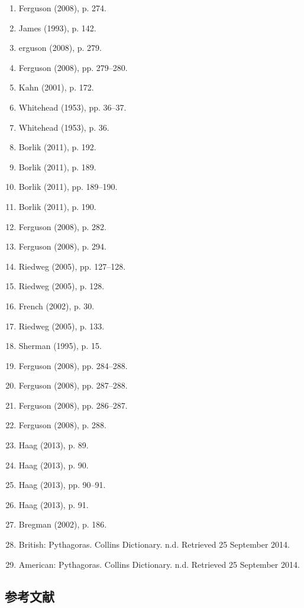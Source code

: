 \begin{enumerate}
\item Ferguson (2008), p. 274.  
\item James (1993), p. 142.  
\item erguson (2008), p. 279.  
\item Ferguson (2008), pp. 279–280.
\item Kahn (2001), p. 172.  
\item Whitehead (1953), pp. 36–37.  
\item Whitehead (1953), p. 36.  
\item Borlik (2011), p. 192.  
\item Borlik (2011), p. 189.  
\item Borlik (2011), pp. 189–190.  
\item Borlik (2011), p. 190.  
\item Ferguson (2008), p. 282.  
\item Ferguson (2008), p. 294.  
\item Riedweg (2005), pp. 127–128.  
\item Riedweg (2005), p. 128.  
\item French (2002), p. 30.  
\item Riedweg (2005), p. 133.  
\item Sherman (1995), p. 15.  
\item Ferguson (2008), pp. 284–288.  
\item Ferguson (2008), pp. 287–288.  
\item Ferguson (2008), pp. 286–287.  
\item Ferguson (2008), p. 288.  
\item Haag (2013), p. 89.  
\item Haag (2013), p. 90.  
\item Haag (2013), pp. 90–91.  
\item Haag (2013), p. 91.  
\item Bregman (2002), p. 186.  
\item British: Pythagoras. Collins Dictionary. n.d. Retrieved 25 September 2014.  
\item American: Pythagoras. Collins Dictionary. n.d. Retrieved 25 September 2014.
\end{enumerate}
\subsection{参考文献}  
